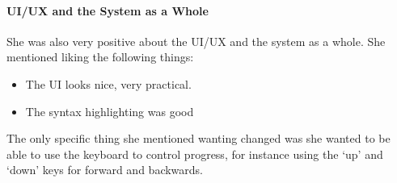 \paragraph{UI/UX and the System as a Whole}
She was also very positive about the UI/UX and the system as a whole. She mentioned liking the following things:

\begin{itemize}
    \item The UI looks nice, very practical.
    \item The syntax highlighting was good
\end{itemize}

The only specific thing she mentioned wanting changed was she wanted to be able to use the keyboard to control progress, for instance using the `up' and `down' keys for forward and backwards.





